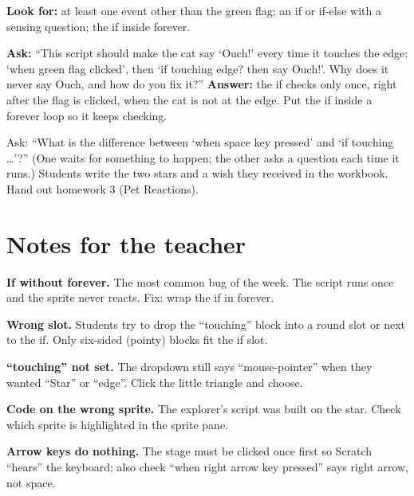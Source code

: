\begin{formativecheck}
\textbf{Look for:} at least one event other than the green flag; an if or if-else with a sensing question; the if inside forever.

\textbf{Ask:} \enquote{This script should make the cat say \enquote{Ouch!} every time it touches the edge: \enquote{when green flag clicked}, then \enquote{if touching edge? then say Ouch!}. Why does it never say Ouch, and how do you fix it?}
\textbf{Answer:} the if checks only once, right after the flag is clicked, when the cat is not at the edge. Put the if inside a forever loop so it keeps checking.
\end{formativecheck}

\begin{reflection}
Ask: \enquote{What is the difference between \enquote{when space key pressed} and \enquote{if touching \ldots}?} (One waits for something to happen; the other asks a question each time it runs.) Students write the two stars and a wish they received in the workbook. Hand out homework 3 (Pet Reactions).
\end{reflection}

\section{Notes for the teacher}
\begin{commonmistakes}
  \item \textbf{If without forever.} The most common bug of the week. The script runs once and the sprite never reacts. Fix: wrap the if in forever.
  \item \textbf{Wrong slot.} Students try to drop the \enquote{touching} block into a round slot or next to the if. Only six-sided (pointy) blocks fit the if slot.
  \item \textbf{\enquote{touching} not set.} The dropdown still says \enquote{mouse-pointer} when they wanted \enquote{Star} or \enquote{edge}. Click the little triangle and choose.
  \item \textbf{Code on the wrong sprite.} The explorer's script was built on the star. Check which sprite is highlighted in the sprite pane.
  \item \textbf{Arrow keys do nothing.} The stage must be clicked once first so Scratch \enquote{hears} the keyboard; also check \enquote{when right arrow key pressed} says right arrow, not space.
\end{commonmistakes}

